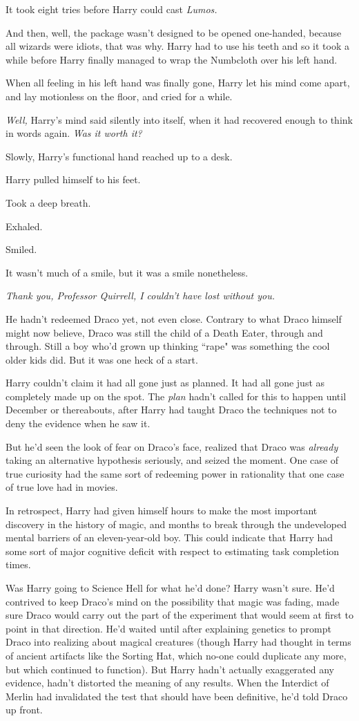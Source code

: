 It took eight tries before Harry could cast \emph{Lumos.}

And then, well, the package wasn't designed to be opened one-handed, because all wizards were idiots, that was why. Harry had to use his teeth and so it took a while before Harry finally managed to wrap the Numbcloth over his left hand.

When all feeling in his left hand was finally gone, Harry let his mind come apart, and lay motionless on the floor, and cried for a while.

\emph{Well,} Harry's mind said silently into itself, when it had recovered enough to think in words again. \emph{Was it worth it?}

Slowly, Harry's functional hand reached up to a desk.

Harry pulled himself to his feet.

Took a deep breath.

Exhaled.

Smiled.

It wasn't much of a smile, but it was a smile nonetheless.

\emph{Thank you, Professor Quirrell, I couldn't have lost without you.}

He hadn't redeemed Draco yet, not even close. Contrary to what Draco himself might now believe, Draco was still the child of a Death Eater, through and through. Still a boy who'd grown up thinking ``rape" was something the cool older kids did. But it was one heck of a start.

Harry couldn't claim it had all gone just as planned. It had all gone just as completely made up on the spot. The \emph{plan} hadn't called for this to happen until December or thereabouts, after Harry had taught Draco the techniques not to deny the evidence when he saw it.

But he'd seen the look of fear on Draco's face, realized that Draco was \emph{already} taking an alternative hypothesis seriously, and seized the moment. One case of true curiosity had the same sort of redeeming power in rationality that one case of true love had in movies.

In retrospect, Harry had given himself hours to make the most important discovery in the history of magic, and months to break through the undeveloped mental barriers of an eleven-year-old boy. This could indicate that Harry had some sort of major cognitive deficit with respect to estimating task completion times.

Was Harry going to Science Hell for what he'd done? Harry wasn't sure. He'd contrived to keep Draco's mind on the possibility that magic was fading, made sure Draco would carry out the part of the experiment that would seem at first to point in that direction. He'd waited until after explaining genetics to prompt Draco into realizing about magical creatures (though Harry had thought in terms of ancient artifacts like the Sorting Hat, which no-one could duplicate any more, but which continued to function). But Harry hadn't actually exaggerated any evidence, hadn't distorted the meaning of any results. When the Interdict of Merlin had invalidated the test that should have been definitive, he'd told Draco up front.

